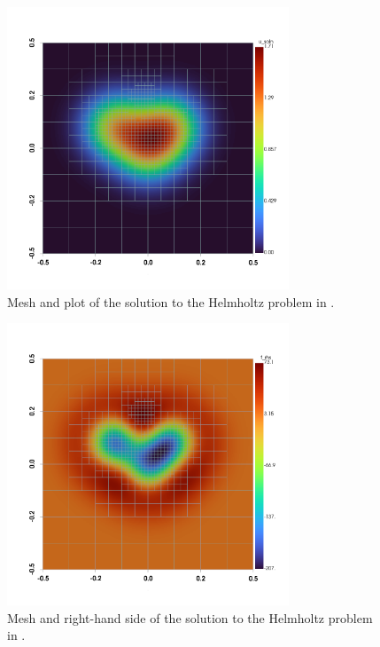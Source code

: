 \begin{figure}
    \centering
    \includegraphics[width=0.75\textwidth, trim={0 100 0 0}]{../figures/plot_helmholtz_u.png}
    \caption{Mesh and plot of the solution to the Helmholtz problem in .}
    \label{fig:helmholtz_u_plot}
\end{figure}

\begin{figure}
    \centering
    \includegraphics[width=0.75\textwidth, trim={0 100 0 0}]{../figures/plot_helmholtz_f.png}
    \caption{Mesh and right-hand side of the solution to the Helmholtz problem in .}
    \label{fig:helmholtz_f_plot}
\end{figure}

